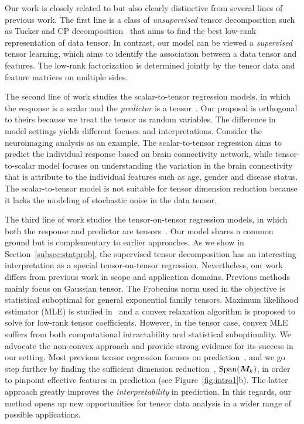 \documentclass[12pt]{article}
\theoremstyle{plain}
\theoremstyle{definition}
\begin{document}
Our work is closely related to but also clearly distinctive from several lines of previous work. The first line is a class of \textit{unsupervised} tensor decomposition such as Tucker and CP decomposition~\citep{de2000multilinear, kolda2009tensor,zhang2018tensor, hong2020generalized} that aims to find the best low-rank representation of data tensor. In contrast, our model can be viewed a \textit{supervised} tensor learning, which aims to identify the association between a data tensor and features. The low-rank factorization is determined jointly by the tensor data and feature matrices on multiple sides.

The second line of work studies the scalar-to-tensor regression models, in which the response is a scalar and the \textit{predictor} is a tensor~\citep{zhou2013tensor,chen2019non}. Our proposal is orthogonal to theirs because we treat the tensor as random variables. The difference in model settings yields different focuses and interpretations. Consider the neuroimaging analysis as an example. The scalar-to-tensor regression aims to predict the individual response based on brain connectivity network, while tensor-to-scalar model focuses on understanding the variation in the brain connectivity that is attribute to the individual features such as age, gender and disease status. The scalar-to-tensor model is not suitable for tensor dimension reduction because it lacks the modeling of stochastic noise in the data tensor. 

The third line of work studies the tensor-on-tensor regression models, in which both the response and predictor are tensors~\citep{raskutti2015convex, lock2018tensor, gahrooei2020multiple}. Our model shares a common ground but is complementary to earlier approaches. As we show in Section~\ref{subsec:statprob}, the supervised tensor decomposition 
has an interesting interpretation as a special tensor-on-tensor regression. Nevertheless, our work differs from previous work in scope and application domains. Previous methods~\citep{gahrooei2020multiple,lock2018tensor} mainly focus on Gaussian tensor. The Frobenius norm used in the objective is statistical suboptimal for general exponential family tensors. Maximum likelihood estimator (MLE) is studied in~\cite{raskutti2015convex} and a convex relaxation algorithm is proposed to solve for low-rank tensor coefficients. However, in the tensor case, convex MLE suffers from both computational intractability and statistical suboptimality. We advocate the non-convex approach and provide strong evidence for its success in our setting. Most previous tensor regression focuses on prediction~\citep{lock2018tensor,raskutti2015convex,gahrooei2020multiple}, and we go step further by finding the sufficient dimension reduction~\citep{adragni2009sufficient}, $\text{Span}(\bm M_k)$, in order to pinpoint effective features in prediction (see Figure~\ref{fig:intro1}b). The latter approach greatly improves the \emph{interpretability} in prediction. In this regards, our method opens up new opportunities for tensor data analysis in a wider range of possible applications. 
\end{document}
